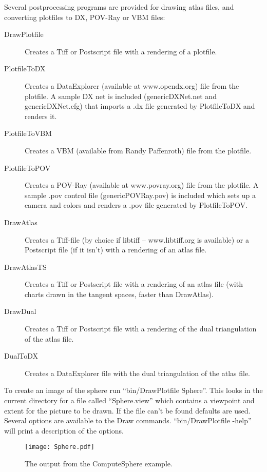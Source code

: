 \documentclass[12pt]{article}
\begin{document}
Several postprocessing programs are provided  for drawing atlas files, and converting plotfiles to DX, POV-Ray or VBM files:
\begin{description}
  \item[DrawPlotfile]
     Creates a Tiff or Postscript file with a rendering of a plotfile.
  \item[PlotfileToDX]
     Creates a DataExplorer (available at www.opendx.org) file from the plotfile. A sample DX net is included
     (genericDXNet.net and genericDXNet.cfg) that imports a .dx file generated by PlotfileToDX and renders it.
  \item[PlotfileToVBM]
     Creates a VBM (available from Randy Paffenroth) file from the plotfile.
  \item[PlotfileToPOV]
     Creates a POV-Ray (available at www.povray.org) file from the plotfile. A sample .pov control file
     (genericPOVRay.pov) is included which sets up a camera and colors and renders a .pov file generated by
     PlotfileToPOV.
  \item[DrawAtlas]
     Creates a Tiff-file (by choice if libtiff -- www.libtiff.org is available) or a Postscript file (if it isn't)
     with a rendering of an atlas file.
  \item[DrawAtlasTS]
     Creates a Tiff or Postscript file with a rendering of an atlas file (with charts
     drawn in the tangent spaces, faster than DrawAtlas).
  \item[DrawDual]
     Creates a Tiff or Postscript file with a rendering of the dual triangulation
     of the atlas file.
  \item[DualToDX]
     Creates a DataExplorer file with the dual triangulation
     of the atlas file.
\end{description}

To create an image of the sphere run ``{bin/DrawPlotfile Sphere}''. This looks in the current directory for a file
called ``{Sphere.view}'' which contains a viewpoint and extent for the picture to be drawn. If the file can't
be found defaults are used. Several options are available to the Draw commands. ``{bin/DrawPlotfile -help}'' will
print a description of the options.

  \begin{figure}
   \begin{center}
     \texttt{[image: Sphere.pdf]}
   \end{center}
   \caption{The output from the {ComputeSphere} example.}
  \end{figure}
\end{document}
